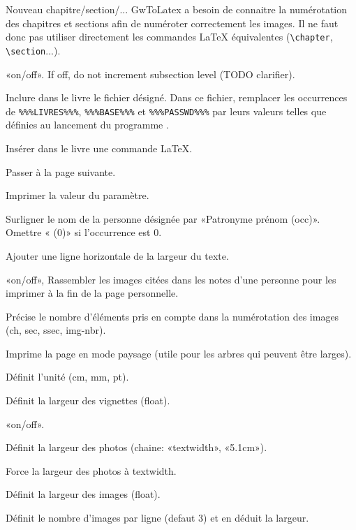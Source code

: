 \begin{description}[style=nextline]
\item[Chapter/Section/SubSection/SubSubSection] Nouveau chapitre/section/...
GwToLatex a besoin de connaitre la numérotation des chapitres et sections afin 
de numéroter correctement les images. Il ne faut donc pas utiliser directement
les commandes LaTeX équivalentes (\verb|\chapter|, \verb|\section|...). 
\item[BumpSub] «on/off». If off, do not increment subsection level (TODO clarifier).

\item[Input] Inclure dans le livre le fichier désigné. Dans ce fichier,
remplacer les occurrences de \verb|%%%LIVRES%%%|, \verb|%%%BASE%%%| et
\verb|%%%PASSWD%%%| par leurs valeurs telles que définies au lancement du programme .
\item[LaTeX] Insérer dans le livre une commande LaTeX.
\item[Newpage] Passer à la page suivante.
\item[Print] Imprimer la valeur du paramètre.

\item[HighLight] Surligner le nom de la personne désignée par «Patronyme prénom (occ)».
Omettre « (0)» si l'occurrence est 0.
\item[Hrule] Ajouter une ligne horizontale de la largeur du texte.

\item[CollectImages] «on/off», Rassembler les images citées dans les notes
d'une personne pour les imprimer à la fin de la page personnelle.
\item[ImageLabel] Précise le nombre d'éléments pris en compte dans 
la numérotation des images (ch, sec, ssec, img-nbr).
\item[Sideways] Imprime la page en mode paysage (utile pour les arbres
qui peuvent être larges).\label{sideways}
\item[Unit] Définit l'unité (cm, mm, pt).
\item[VignWidth] Définit la largeur des vignettes (float).
\item[Wide] «on/off».
\item[ImageWidth] Définit la largeur des photos (chaine: «textwidth», «5.1cm»).
\item[WideImage] Force la largeur des photos à textwidth.
\item[Width] Définit la largeur des images (float).
\item[NbImgPerLine] Définit le nombre d'images par ligne (defaut 3) et en
déduit la largeur.


\end{description}
